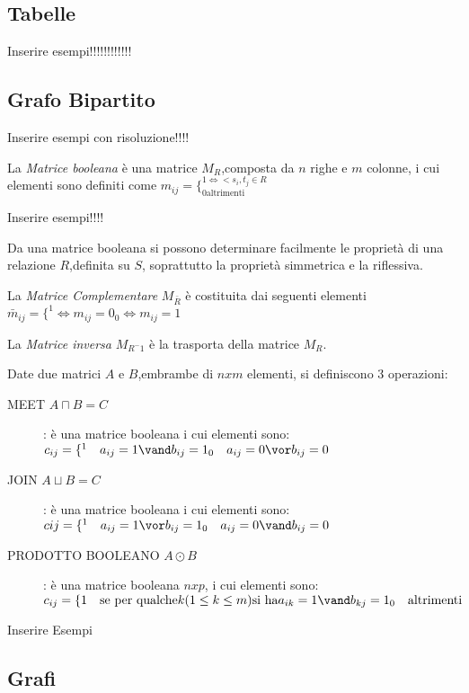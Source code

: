 \subsection{Tabelle}
Inserire esempi!!!!!!!!!!!!

\subsection{Grafo Bipartito}
Inserire esempi con risoluzione!!!!

La \emph{Matrice booleana} è una matrice $M_R$,composta da $n$ righe e $m$ colonne,
i cui elementi sono definiti come $m_{ij} = \{ ^{1 \iff <s_i,t_j \in R} _{0 \text{altrimenti}}$

Inserire esempi!!!!

Da una matrice booleana si possono determinare facilmente le proprietà
di una relazione $R$,definita su $S$, soprattutto la proprietà simmetrica e la riflessiva.

La \emph{Matrice Complementare} $M_{\bar{R}}$ è costituita dai seguenti elementi
$\bar{m}_{ij} = \{ ^ 1 \iff m_{ij} = 0 _ 0 \iff m_{ij} = 1$

La \emph{Matrice inversa} $M_{R ^-1}$ è la trasporta della matrice $M_R$.

Date due matrici $A$ e $B$,embrambe di $n x m$ elementi, si definiscono 3 operazioni:
\begin{description}
    \item[MEET $A \sqcap B = C$]: è una matrice booleana i cui elementi sono:
    $c_{ij} = \{ ^ 1 \quad a_{ij} = 1 \vand b_{ij} = 1 _ 0 \quad a_{ij} = 0 \vor b_{ij} = 0$
    \item[JOIN $A \sqcup B = C$]: è una matrice booleana i cui elementi sono:
    $c{ij} = \{ ^ 1 \quad a_{ij} = 1 \vor b_{ij} = 1 _ 0 \quad a_{ij} = 0 \vand b_{ij} = 0$
    \item[PRODOTTO BOOLEANO $A \odot B$]: è una matrice booleana $n x p$, i cui elementi sono:
    $c_{ij} = \{1 \quad \text{se per qualche} k(1 \leq k \leq m) \text{si ha} a_{ik} = 1 \vand b_{kj} = 1
    _ 0 \quad \text{altrimenti}$
\end{description}

Inserire Esempi

\subsection{Grafi}

